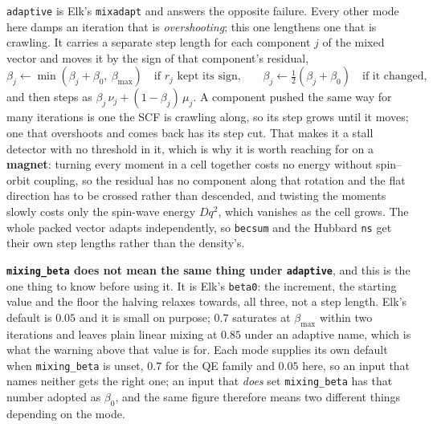 \documentclass[11pt,a4paper]{article}
\newcommand{\code}[1]{\texttt{\small #1}}
\begin{document}
\code{adaptive} is Elk's \code{mixadapt} and answers the opposite failure. Every
other mode here damps an iteration that is \emph{overshooting}; this one lengthens
one that is crawling. It carries a separate step length for each component $j$ of
the mixed vector and moves it by the sign of that component's residual,
\begin{equation*}
  \beta_j \leftarrow \min(\beta_j + \beta_0,\ \beta_{\max})
  \quad\text{if } r_j \text{ kept its sign,}
  \qquad
  \beta_j \leftarrow \tfrac{1}{2}(\beta_j + \beta_0) \quad\text{if it changed,}
\end{equation*}
and then steps as $\beta_j\,\nu_j + (1-\beta_j)\,\mu_j$. A component pushed the
same way for many iterations is one the SCF is crawling along, so its step grows
until it moves; one that overshoots and comes back has its step cut. That makes it
a stall detector with no threshold in it, which is why it is worth reaching for on
a \textbf{magnet}: turning every moment in a cell together costs no energy without
spin--orbit coupling, so the residual has no component along that rotation and the
flat direction has to be crossed rather than descended, and twisting the moments
slowly costs only the spin-wave energy $D q^2$, which vanishes as the cell grows.
The whole packed vector adapts independently, so \code{becsum} and the Hubbard
\code{ns} get their own step lengths rather than the density's.

\textbf{\code{mixing\_beta} does not mean the same thing under \code{adaptive}},
and this is the one thing to know before using it. It is Elk's \code{beta0}: the
increment, the starting value and the floor the halving relaxes towards, all
three, not a step length. Elk's default is $0.05$ and it is small on purpose;
$0.7$ saturates at $\beta_{\max}$ within two iterations and leaves plain linear
mixing at $0.85$ under an adaptive name, which is what the warning above that
value is for. Each mode supplies its own default when \code{mixing\_beta} is
unset, $0.7$ for the QE family and $0.05$ here, so an input that names neither
gets the right one; an input that \emph{does} set \code{mixing\_beta} has that
number adopted as $\beta_0$, and the same figure therefore means two different
things depending on the mode.
\end{document}
